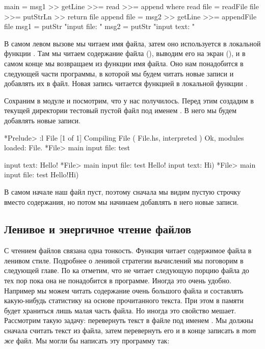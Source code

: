 \begin{code}
main = msg1 >> getLine >>= read >>= append
    where read   file = readFile file >>= putStrLn >> return file
          append file = msg2 >> getLine >>= appendFile file
          msg1        = putStr "input file: "
          msg2        = putStr "input text: "
\end{code}

В самом левом вызове  мы читаем имя файла, затем
оно используется в локальной функции . Там мы читаем
содержание файла (), выводим его на экран (),
и в самом конце мы возвращаем из функции имя файла. Оно нам понадобится
в следующей части программы, в которой мы будем читать новые записи
и добавлять их в файл. Новая запись читается функцией 
в локальной функции .

Сохраним в модуле  и посмотрим, что у нас получилось.
Перед этим создадим в текущей директории тестовый
пустой файл под именем . В него мы будем добавлять новые
записи. 

\begin{code}
*Prelude> :l File
[1 of 1] Compiling File             ( File.hs, interpreted )
Ok, modules loaded: File.
*File> main
input file: test

input text: Hello!
*File> main
input file: test
Hello!
input text: Hi)
*File> main
input file: test
Hello!Hi)
\end{code}

В самом начале наш файл пуст, поэтому сначала мы видим
пустую строчку вместо содержания, но потом мы начинаем добавлять
в него новые записи.

\subsection{Ленивое и энергичное чтение файлов}

С чтением файлов связана одна тонкость. Функция 
читает содержимое файла в ленивом стиле. Подробнее о
ленивой стратегии вычислений мы поговорим в следующей главе. 
По ка отметим, что  не читает 
следующую порцию файла до тех пор пока она не понадобится 
в программе. Иногда это очень удобно. Например мы можем
читать содержание очень большого файла и составлять какую-нибудь
статистику на основе прочитанного текста. При этом в памяти
будет храниться лишь малая часть файла. Но иногда это 
свойство мешает. Рассмотрим такую задачу: перевернуть
текст в файле под именем . Мы должны сначала считать текст из файла,
затем перевернуть его и в конце записать в \emph{тот же} файл. 
Мы могли бы написать эту программу так:

